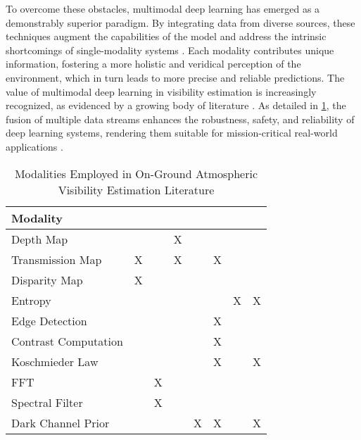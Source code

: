 To overcome these obstacles, multimodal deep learning has emerged as a demonstrably superior paradigm. By integrating data from diverse sources, these techniques augment the capabilities of the model and address the intrinsic shortcomings of single-modality systems \cite{liu2018learn, castanedo2013review, molino2021improved, blasch2021machine}. Each modality contributes unique information, fostering a more holistic and veridical perception of the environment, which in turn leads to more precise and reliable predictions. The value of multimodal deep learning in visibility estimation is increasingly recognized, as evidenced by a growing body of literature \cite{palvanov_visnet_2019, department_of_computer_science_chu_hai_college_of_higher_education_80_castle_peak_road_castle_peak_bay_tuen_mun_nt_hong_kong_meteorology_2020, AitOuadil2023, app11030997, Zhang2023, You2022, Chen2022, Wauben2016, Cheng2018, Zhou2021}. As detailed in \cref{tab:literature_review}, the fusion of multiple data streams enhances the robustness, safety, and reliability of deep learning systems, rendering them suitable for mission-critical real-world applications \cite{6817512, liang2024foundationsmultisensoryartificialintelligence, huang2021makesmultimodallearningbetter}.

\begin{table}[htbp]
\centering
\caption{Modalities Employed in On-Ground Atmospheric Visibility Estimation Literature}
\label{tab:literature_review}
\begin{tabular}{@{}lccccccc@{}}
\toprule
\textbf{Modality} & \textbf{\cite{You2022}} & \textbf{\cite{Palvanov2019}} & \textbf{\cite{Zhang2023}} & \textbf{\cite{Chen2022}} & \textbf{\cite{Wauben2016}} & \textbf{\cite{Cheng2018}} & \textbf{\cite{Zhou2021}} \\
\midrule
Depth Map &  & & X & & & & \\
Transmission Map  & X & & X & & X & & \\
Disparity Map & X & & & & & &  \\
Entropy & & & & &  & X & X \\
Edge Detection & & & & & X & &  \\
Contrast Computation   & & & & & X & & \\
Koschmieder Law & &  & & & X & & X \\
FFT & & X & & & & & \\
Spectral Filter & & X & & & & & \\
Dark Channel Prior & & & & X & X & & X\\
\bottomrule
\end{tabular}
\end{table}

